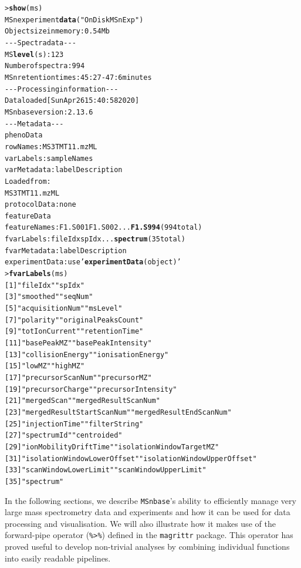\documentclass[journal=jacsat,manuscript=article]{achemso}\usepackage[]{graphicx}\usepackage[]{color}
\makeatletter
\newcommand{\hlstr}[1]{\textcolor[rgb]{0.192,0.494,0.8}{#1}}%
\newcommand{\hlkwd}[1]{\textcolor[rgb]{0.737,0.353,0.396}{\textbf{#1}}}%
\newenvironment{kframe}{%
 \def\at@end@of@kframe{}%
 \ifinner\ifhmode%
  \def\at@end@of@kframe{\end{minipage}}%
  \begin{minipage}{\columnwidth}%
 \fi\fi%
 \def\FrameCommand##1{\hskip\@totalleftmargin \hskip-\fboxsep
 \colorbox{shadecolor}{##1}\hskip-\fboxsep
     \hskip-\linewidth \hskip-\@totalleftmargin \hskip\columnwidth}%
 \MakeFramed {\advance\hsize-\width
   \@totalleftmargin\z@ \linewidth\hsize
   \@setminipage}}%
 {\par\unskip\endMakeFramed%
 \at@end@of@kframe}
\newenvironment{knitrout}{}{} %
\makeatother
\begin{document}
\begin{knitrout}
\color{fgcolor}\begin{kframe}
\begin{alltt}
> \hlkwd{show}(ms)
MSn experiment \hlkwd{data} (\hlstr{"OnDiskMSnExp"})
Object size in memory: 0.54 Mb
- - - Spectra data - - -
 MS \hlkwd{level}(s): 1 2 3 
 Number of spectra: 994 
 MSn retention times: 45:27 - 47:6 minutes
- - - Processing information - - -
Data loaded [Sun Apr 26 15:40:58 2020] 
 MSnbase version: 2.13.6 
- - - Meta data  - - -
phenoData
  rowNames: MS3TMT11.mzML
  varLabels: sampleNames
  varMetadata: labelDescription
Loaded from:
  MS3TMT11.mzML 
protocolData: none
featureData
  featureNames: F1.S001 F1.S002 ... \hlkwd{F1.S994} (994 total)
  fvarLabels: fileIdx spIdx ... \hlkwd{spectrum} (35 total)
  fvarMetadata: labelDescription
experimentData: use \hlstr{'\hlkwd{experimentData}(object)'}
> \hlkwd{fvarLabels}(ms)
 [1] \hlstr{"fileIdx"}                    \hlstr{"spIdx"}
 [3] \hlstr{"smoothed"}                   \hlstr{"seqNum"}
 [5] \hlstr{"acquisitionNum"}             \hlstr{"msLevel"}
 [7] \hlstr{"polarity"}                   \hlstr{"originalPeaksCount"}
 [9] \hlstr{"totIonCurrent"}              \hlstr{"retentionTime"}
[11] \hlstr{"basePeakMZ"}                 \hlstr{"basePeakIntensity"}
[13] \hlstr{"collisionEnergy"}            \hlstr{"ionisationEnergy"}
[15] \hlstr{"lowMZ"}                      \hlstr{"highMZ"}
[17] \hlstr{"precursorScanNum"}           \hlstr{"precursorMZ"}
[19] \hlstr{"precursorCharge"}            \hlstr{"precursorIntensity"}
[21] \hlstr{"mergedScan"}                 \hlstr{"mergedResultScanNum"}
[23] \hlstr{"mergedResultStartScanNum"}   \hlstr{"mergedResultEndScanNum"}
[25] \hlstr{"injectionTime"}              \hlstr{"filterString"}
[27] \hlstr{"spectrumId"}                 \hlstr{"centroided"}
[29] \hlstr{"ionMobilityDriftTime"}       \hlstr{"isolationWindowTargetMZ"}
[31] \hlstr{"isolationWindowLowerOffset"} \hlstr{"isolationWindowUpperOffset"}
[33] \hlstr{"scanWindowLowerLimit"}       \hlstr{"scanWindowUpperLimit"}
[35] \hlstr{"spectrum"}
\end{alltt}
\end{kframe}
\end{knitrout}

In the following sections, we describe \texttt{MSnbase}'s ability to efficiently
manage very large mass spectrometry data and experiments and how it can be used
for data processing and visualisation. We will also illustrate how it makes use
of the forward-pipe operator (\texttt{\%>\%}) defined in the \texttt{magrittr}
package. This operator has proved useful to develop non-trivial analyses by
combining individual functions into easily readable pipelines.
\end{document}
